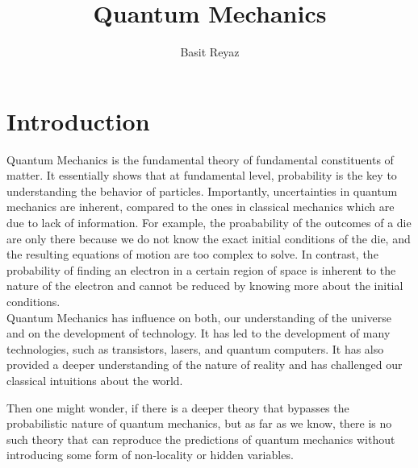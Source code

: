 \documentclass{article}
\begin{document}
\title{Quantum Mechanics}
\author{Basit Reyaz}
\maketitle


\section{Introduction}
Quantum Mechanics is the fundamental theory of fundamental constituents of matter. It essentially shows that at fundamental level, probability is the key to understanding the behavior of particles.
Importantly, uncertainties in quantum mechanics are inherent, compared to the ones in classical mechanics which are due to lack of information.
For example, the proabability of the outcomes of a die are only there because we do not know the exact initial conditions of the die, and the resulting equations of motion are too complex to solve. In contrast, the probability of finding an electron in a certain region of space is inherent to the nature of the electron and cannot be reduced by knowing more about the initial conditions.
\\ Quantum Mechanics has influence on both, our understanding of the universe and on the development of technology. It has led to the development of many technologies, such as transistors, lasers, and quantum computers. It has also provided a deeper understanding of the nature of reality and has challenged our classical intuitions about the world.

Then one might wonder, if there is a deeper theory that bypasses the probabilistic nature of quantum mechanics, but as far as we know, there is no such theory that can reproduce the predictions of quantum mechanics without introducing some form of non-locality or hidden variables.
\end{document}
